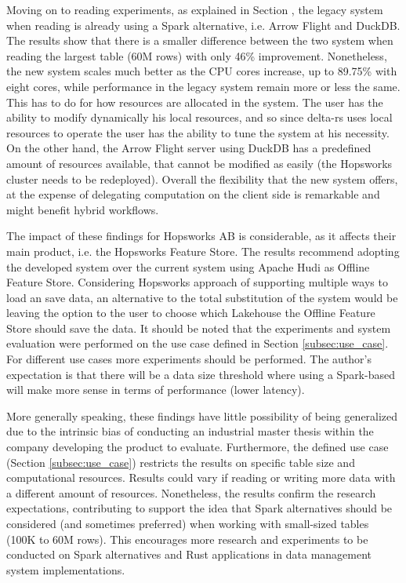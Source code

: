 Moving on to reading experiments, as explained in Section , the legacy system when reading is already using a Spark alternative, i.e. Arrow Flight and DuckDB. The results show that there is a smaller difference between the two system when reading the largest table (60M rows) with only 46\% improvement. Nonetheless, the new system scales much better as the \gls{CPU} cores increase, up to 89.75\% with eight cores, while performance in the legacy system remain more or less the same. This has to do for how resources are allocated in the system. The user has the ability to modify dynamically his local resources, and so since delta-rs uses local resources to operate the user has the ability to tune the system at his necessity. On the other hand, the Arrow Flight server using DuckDB has a predefined amount of resources available, that cannot be modified as easily (the Hopsworks cluster needs to be redeployed). Overall the flexibility that the new system offers, at the expense of delegating computation on the client side is remarkable and might benefit hybrid workflows.

The impact of these findings for Hopsworks \gls{AB} is considerable, as it affects their main product, i.e. the Hopsworks Feature Store. The results recommend adopting the developed system over the current system using Apache Hudi as Offline Feature Store. Considering Hopsworks approach of supporting multiple ways to load an save data, an alternative to the total substitution of the system would be leaving the option to the user to choose which Lakehouse the Offline Feature Store should save the data. It should be noted that the experiments and system evaluation were performed on the use case defined in Section \ref{subsec:use_case}. For different use cases more experiments should be performed. The author's expectation is that there will be a data size threshold where using a Spark-based will make more sense in terms of performance (lower latency).

More generally speaking, these findings have little possibility of being generalized due to the intrinsic bias of conducting an industrial master thesis within the company developing the product to evaluate. Furthermore, the defined use case (Section \ref{subsec:use_case}) restricts the results on specific table size and computational resources. Results could vary if reading or writing more data with a different amount of resources. Nonetheless, the results confirm the research expectations, contributing to support the idea that Spark alternatives should be considered (and sometimes preferred) when working with small-sized tables (100K to 60M rows). This encourages more research and experiments to be conducted on Spark alternatives and Rust applications in data management system implementations. 

